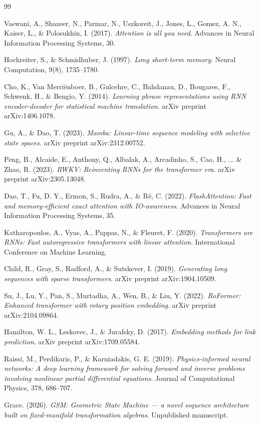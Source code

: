 \documentclass[11pt]{article}
\begin{document}

\begin{thebibliography}{99}

Vaswani, A., Shazeer, N., Parmar, N., Uszkoreit, J., Jones, L., Gomez, A. N., Kaiser, L., \& Polosukhin, I. (2017).
\textit{Attention is all you need}.
Advances in Neural Information Processing Systems, 30.

Hochreiter, S., \& Schmidhuber, J. (1997).
\textit{Long short-term memory}.
Neural Computation, 9(8), 1735--1780.

Cho, K., Van Merriënboer, B., Gulcehre, C., Bahdanau, D., Bougares, F., Schwenk, H., \& Bengio, Y. (2014).
\textit{Learning phrase representations using RNN encoder-decoder for statistical machine translation}.
arXiv preprint arXiv:1406.1078.

Gu, A., \& Dao, T. (2023).
\textit{Mamba: Linear-time sequence modeling with selective state spaces}.
arXiv preprint arXiv:2312.00752.

Peng, B., Alcaide, E., Anthony, Q., Albalak, A., Arcadinho, S., Cao, H., ... \& Zhao, R. (2023).
\textit{RWKV: Reinventing RNNs for the transformer era}.
arXiv preprint arXiv:2305.13048.

Dao, T., Fu, D. Y., Ermon, S., Rudra, A., \& Ré, C. (2022).
\textit{FlashAttention: Fast and memory-efficient exact attention with IO-awareness}.
Advances in Neural Information Processing Systems, 35.

Katharopoulos, A., Vyas, A., Pappas, N., \& Fleuret, F. (2020).
\textit{Transformers are RNNs: Fast autoregressive transformers with linear attention}.
International Conference on Machine Learning.

Child, R., Gray, S., Radford, A., \& Sutskever, I. (2019).
\textit{Generating long sequences with sparse transformers}.
arXiv preprint arXiv:1904.10509.

Su, J., Lu, Y., Pan, S., Murtadha, A., Wen, B., \& Liu, Y. (2022).
\textit{RoFormer: Enhanced transformer with rotary position embedding}.
arXiv preprint arXiv:2104.09864.

Hamilton, W. L., Leskovec, J., \& Jurafsky, D. (2017).
\textit{Embedding methods for link prediction}.
arXiv preprint arXiv:1709.05584.

Raissi, M., Perdikaris, P., \& Karniadakis, G. E. (2019).
\textit{Physics-informed neural networks: A deep learning framework for solving forward and inverse problems involving nonlinear partial differential equations}.
Journal of Computational Physics, 378, 686--707.

Grace. (2026).
\textit{GSM: Geometric State Machine — a novel sequence architecture built on fixed-manifold transformation algebras}.
Unpublished manuscript.

\end{thebibliography}
\end{document}
